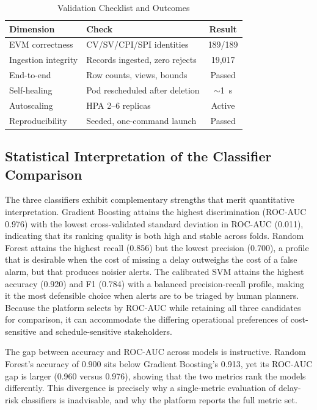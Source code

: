 \documentclass[conference]{IEEEtran}
\begin{document}
\begin{table}[t]
\caption{Validation Checklist and Outcomes}
\label{tab:validation}
\centering
\footnotesize
\begin{tabular}{@{}p{2.6cm}p{3.8cm}c@{}}
\toprule
\textbf{Dimension} & \textbf{Check} & \textbf{Result} \\
\midrule
EVM correctness & CV/SV/CPI/SPI identities & 189/189 \\
Ingestion integrity & Records ingested, zero rejects & 19,017 \\
End-to-end & Row counts, views, bounds & Passed \\
Self-healing & Pod rescheduled after deletion & $\sim$1~s \\
Autoscaling & HPA 2--6 replicas & Active \\
Reproducibility & Seeded, one-command launch & Passed \\
\bottomrule
\end{tabular}
\end{table}

\subsection{Statistical Interpretation of the Classifier Comparison}

The three classifiers exhibit complementary strengths that merit quantitative interpretation. Gradient Boosting attains the highest discrimination (ROC-AUC 0.976) with the lowest cross-validated standard deviation in ROC-AUC (0.011), indicating that its ranking quality is both high and stable across folds. Random Forest attains the highest recall (0.856) but the lowest precision (0.700), a profile that is desirable when the cost of missing a delay outweighs the cost of a false alarm, but that produces noisier alerts. The calibrated SVM attains the highest accuracy (0.920) and F1 (0.784) with a balanced precision-recall profile, making it the most defensible choice when alerts are to be triaged by human planners. Because the platform selects by ROC-AUC while retaining all three candidates for comparison, it can accommodate the differing operational preferences of cost-sensitive and schedule-sensitive stakeholders.

The gap between accuracy and ROC-AUC across models is instructive. Random Forest's accuracy of 0.900 sits below Gradient Boosting's 0.913, yet its ROC-AUC gap is larger (0.960 versus 0.976), showing that the two metrics rank the models differently. This divergence is precisely why a single-metric evaluation of delay-risk classifiers is inadvisable, and why the platform reports the full metric set.
\end{document}
